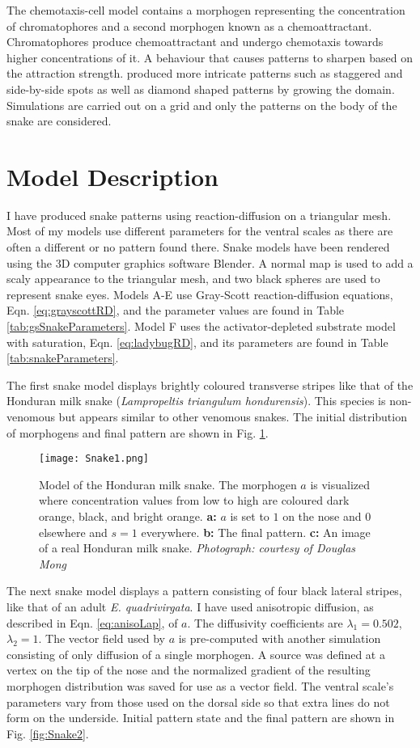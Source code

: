 The chemotaxis-cell model contains a morphogen representing the concentration of chromatophores and a second morphogen known as a chemoattractant. Chromatophores produce chemoattractant and undergo chemotaxis towards higher concentrations of it. A behaviour that causes patterns to sharpen based on the attraction strength. \citet{MURRAY1991} produced more intricate patterns such as staggered and side-by-side spots as well as diamond shaped patterns by growing the domain. Simulations are carried out on a grid and only the patterns on the body of the snake are considered.

\section{Model Description}
I have produced snake patterns using reaction-diffusion on a triangular mesh. Most of my models use different parameters for the ventral scales as there are often a different or no pattern found there. Snake models have been rendered using the 3D computer graphics software Blender. A normal map is used to add a scaly appearance to the triangular mesh, and two black spheres are used to represent snake eyes. Models A-E use Gray-Scott reaction-diffusion equations, Eqn. \ref{eq:grayscottRD}, and the parameter values are found in Table \ref{tab:gsSnakeParameters}. Model F uses the activator-depleted substrate model with saturation, Eqn. \ref{eq:ladybugRD}, and its parameters are found in Table \ref{tab:snakeParameters}.

\newpage
The first snake model displays brightly coloured transverse stripes like that of the Honduran milk snake (\textit{Lampropeltis triangulum hondurensis}). This species is non-venomous but appears similar to other venomous snakes. The initial distribution of morphogens and final pattern are shown in Fig. \ref{fig:Snake1}.

\begin{figure}[ht]
	\centering
	\texttt{[image: Snake1.png]}
	\caption{Model of the Honduran milk snake. The morphogen $a$ is visualized where concentration values from low to high are coloured dark orange, black, and bright orange. \textbf{a:} $a$ is set to $1$ on the nose and $0$ elsewhere and $s=1$ everywhere. \textbf{b:} The final pattern. \textbf{c:} An image of a real Honduran milk snake. \textit{Photograph: courtesy of Douglas Mong}}
	\label{fig:Snake1}
\end{figure}

The next snake model displays a pattern consisting of four black lateral stripes, like that of an adult \textit{E. quadrivirgata}. I have used anisotropic diffusion, as described in Eqn. \ref{eq:anisoLap}, of $a$. The diffusivity coefficients are $\lambda_{1}=0.502$, $\lambda_{2}=1$. The vector field used by $a$ is pre-computed with another simulation consisting of only diffusion of a single morphogen. A source was defined at a vertex on the tip of the nose and the normalized gradient of the resulting morphogen distribution was saved for use as a vector field. The ventral scale's parameters vary from those used on the dorsal side so that extra lines do not form on the underside. Initial pattern state and the final pattern are shown in Fig. \ref{fig:Snake2}.

